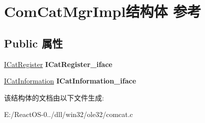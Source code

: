 \hypertarget{struct_com_cat_mgr_impl}{}\section{Com\+Cat\+Mgr\+Impl结构体 参考}
\label{struct_com_cat_mgr_impl}
\subsection*{Public 属性}
\begin{DoxyCompactItemize}
\item 
\mbox{\label{struct_com_cat_mgr_impl_a898eea938e6c54eb583e1a0a4c8b2457}} 
\hyperlink{interface_i_cat_register}{I\+Cat\+Register} {\bfseries I\+Cat\+Register\+\_\+iface}
\item 
\mbox{\label{struct_com_cat_mgr_impl_ae6b43e7e80bf9ebd61a9e064b2a075ff}} 
\hyperlink{interface_i_cat_information}{I\+Cat\+Information} {\bfseries I\+Cat\+Information\+\_\+iface}
\end{DoxyCompactItemize}


该结构体的文档由以下文件生成\+:\begin{DoxyCompactItemize}
\item 
E\+:/\+React\+O\+S-\/0../dll/win32/ole32/comcat.\+c\end{DoxyCompactItemize}
